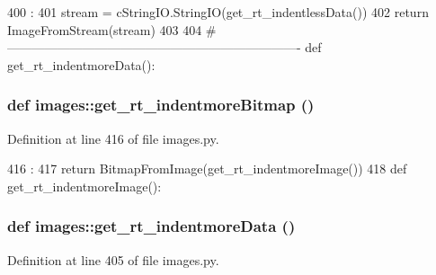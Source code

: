 \begin{DoxyCode}
400                             :
401     stream = cStringIO.StringIO(get_rt_indentlessData())
402     return ImageFromStream(stream)
403 
404 #----------------------------------------------------------------------
def get_rt_indentmoreData():
\end{DoxyCode}
\hypertarget{namespaceimages_a0b82a04475bbaa1467cd4cbca3e1a96e}{
\subsubsection[{get\_\-rt\_\-indentmoreBitmap}]{\setlength{\rightskip}{0pt plus 5cm}def images::get\_\-rt\_\-indentmoreBitmap ()}}
\label{namespaceimages_a0b82a04475bbaa1467cd4cbca3e1a96e}


Definition at line 416 of file images.py.


\begin{DoxyCode}
416                              :
417     return BitmapFromImage(get_rt_indentmoreImage())
418 
def get_rt_indentmoreImage():
\end{DoxyCode}
\hypertarget{namespaceimages_a56890700e7ce7216db68610c7644f525}{
\subsubsection[{get\_\-rt\_\-indentmoreData}]{\setlength{\rightskip}{0pt plus 5cm}def images::get\_\-rt\_\-indentmoreData ()}}
\label{namespaceimages_a56890700e7ce7216db68610c7644f525}


Definition at line 405 of file images.py.


